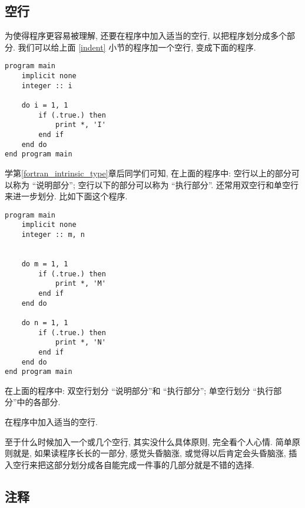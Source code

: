 \subsection{空行}

为使得程序更容易被理解, 还要在程序中加入适当的空行, 以把程序划分成多个部分. 我们可以给上面 \ref{indent} 小节的程序加一个空行, 变成下面的程序.
\begin{lstlisting}
program main
    implicit none
    integer :: i

    do i = 1, 1
        if (.true.) then
            print *, 'I'
        end if
    end do
end program main
\end{lstlisting}
学第\ref{fortran_intrinsic_type}章后同学们可知, 在上面的程序中: 空行以上的部分可以称为 ``说明部分''; 空行以下的部分可以称为 ``执行部分''. 还常用双空行和单空行来进一步划分. 比如下面这个程序.
\begin{lstlisting}
program main
    implicit none
    integer :: m, n


    do m = 1, 1
        if (.true.) then
            print *, 'M'
        end if
    end do

    do n = 1, 1
        if (.true.) then
            print *, 'N'
        end if
    end do
end program main
\end{lstlisting}
在上面的程序中: 双空行划分 ``说明部分''和 ``执行部分''; 单空行划分 ``执行部分''中的各部分.
\begin{convention}
    在程序中加入适当的空行.
\end{convention}
至于什么时候加入一个或几个空行, 其实没什么具体原则, 完全看个人心情. 简单原则就是, 如果读程序长长的一部分, 感觉头昏脑涨, 或觉得以后肯定会头昏脑涨, 插入空行来把这部分划分成各自能完成一件事的几部分就是不错的选择.

\subsection{注释}


